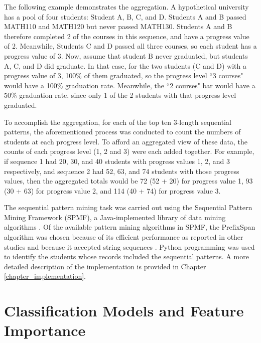 The following example demonstrates the aggregation.  A hypothetical university has a pool of four students: Student A, B, C, and D.  Students A and B passed MATH110 and MATH120 but never passed MATH130.  Students A and B therefore completed 2 of the courses in this sequence, and have a progress value of 2.  Meanwhile, Students C and D passed all three courses, so each student has a progress value of 3.  Now, assume that student B never graduated, but students A, C, and D did graduate.  In that case, for the two students (C and D) with a progress value of 3, 100\% of them graduated, so the progress level ``3 courses" would have a 100\% graduation rate.  Meanwhile, the ``2 courses" bar would have a 50\% graduation rate, since only 1 of the 2 students with that progress level graduated.

To accomplish the aggregation, for each of the top ten 3-length sequential patterns, the aforementioned process was conducted to count the numbers of students at each progress level.  To afford an aggregated view of these data, the counts of each progress level (1, 2 and 3) were each added together.  For example, if sequence 1 had 20, 30, and 40 students with progress values 1, 2, and 3 respectively, and sequence 2 had 52, 63, and 74 students with those progress values, then the aggregated totals would be 72 (52 + 20) for progress value 1, 93 (30 + 63) for progress value 2, and 114 (40 + 74) for progress value 3.  

The sequential pattern mining task was carried out using the Sequential Pattern Mining Framework (SPMF), a Java-implemented library of data mining algorithms \cite{Viger}.  Of the available pattern mining algorithms in SPMF, the PrefixSpan algorithm was chosen because of its efficient performance as reported in other studies \cite{Pei, Maylawati} and because it accepted string sequences \cite{Viger_PrefixSpan}.  Python programming was used to identify the students whose records included the sequential patterns.  A more detailed description of the implementation is provided in Chapter \ref{chapter_implementation}.



\section{Classification Models and Feature Importance}
\label{feature_importance_subsection}


